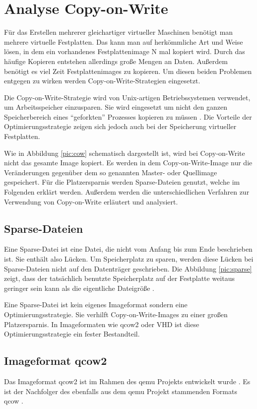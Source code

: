 \chapter{Analyse Copy-on-Write}
Für das Erstellen mehrerer gleichartiger virtueller Maschinen benötigt man mehrere virtuelle Festplatten. Das kann man auf herkömmliche Art und Weise lösen, in dem ein vorhandenes Festplattenimage N mal kopiert wird. Durch das häufige Kopieren entstehen allerdings große Mengen an Daten. Außerdem benötigt es viel Zeit Festplattenimages zu kopieren. Um diesen beiden Problemen entgegen zu wirken werden Copy-on-Write-Strategien eingesetzt.

Die Copy-on-Write-Strategie wird von Unix-artigen Betriebssystemen verwendet, um Arbeitsspeicher einzusparen. Sie wird eingesetzt um nicht den ganzen Speicherbereich eines ``geforkten'' Prozesses kopieren zu müssen \cite{linuxcow}. Die Vorteile der Optimierungsstrategie zeigen sich jedoch auch bei der Speicherung virtueller Festplatten.

Wie in Abbildung \ref{pic:cow} schematisch dargestellt ist, wird bei Copy-on-Write nicht das gesamte Image kopiert. Es werden in dem Copy-on-Write-Image nur die Veränderungen gegenüber dem so genannten Master- oder Quellimage gespeichert. Für die Platzersparnis werden Sparse-Dateien genutzt, welche im Folgenden erklärt werden. Außerdem werden die unterschiedlichen Verfahren zur Verwendung von Copy-on-Write erläutert und analysiert.

\section{Sparse-Dateien}
Eine Sparse-Datei ist eine Datei, die nicht vom Anfang bis zum Ende beschrieben ist. Sie enthält also Lücken. Um Speicherplatz zu sparen, werden diese Lücken bei Sparse-Dateien nicht auf den Datenträger geschrieben. Die Abbildung \ref{pic:sparse} zeigt, dass der tatsächlich benutzte Speicherplatz auf der Festplatte weitaus geringer sein kann als die eigentliche Dateigröße \cite{Sparse}.


Eine Sparse-Datei ist kein eigenes Imageformat sondern eine Optimierungsstrategie. Sie verhilft Copy-on-Write-Images zu einer großen Platzersparnis. In Imageformaten wie qcow2 oder VHD ist diese Optimierungsstrategie ein fester Bestandteil. 

\section{Imageformat qcow2}
Das Imageformat qcow2 ist im Rahmen des qemu Projekts entwickelt wurde \cite{qemuwiki}. Es ist der Nachfolger des ebenfalls aus dem qemu Projekt stammenden Formats qcow \cite{qcowmarkmc}.  

